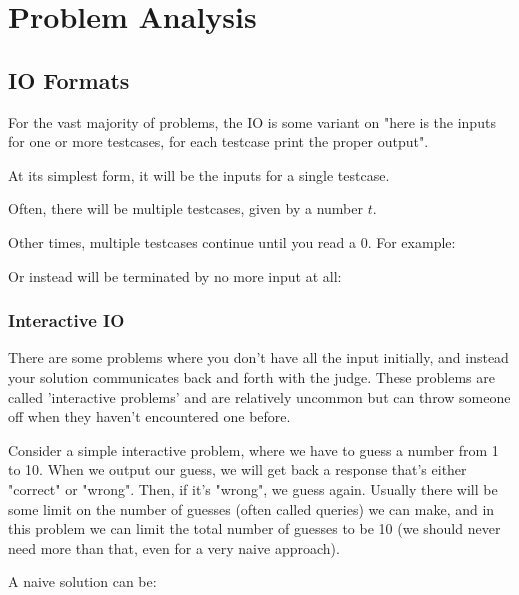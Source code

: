 \section{Problem Analysis}

\subsection{IO Formats}

For the vast majority of problems, the IO is some variant on "here is the inputs for one or more testcases, for each testcase print the proper output".

At its simplest form, it will be the inputs for a single testcase.


Often, there will be multiple testcases, given by a number $t$.


Other times, multiple testcases continue until you read a 0. For example:


Or instead will be terminated by no more input at all:


\subsubsection{Interactive IO}

There are some problems where you don't have all the input initially, and instead your solution communicates back and forth with the judge. These problems are called 'interactive problems' and are relatively uncommon but can throw someone off when they haven't encountered one before.

Consider a simple interactive problem, where we have to guess a number from 1 to 10. When we output our guess, we will get back a response that's either "correct" or "wrong". Then, if it's "wrong", we guess again. Usually there will be some limit on the number of guesses (often called queries) we can make, and in this problem we can limit the total number of guesses to be 10 (we should never need more than that, even for a very naive approach).

A naive solution can be:


